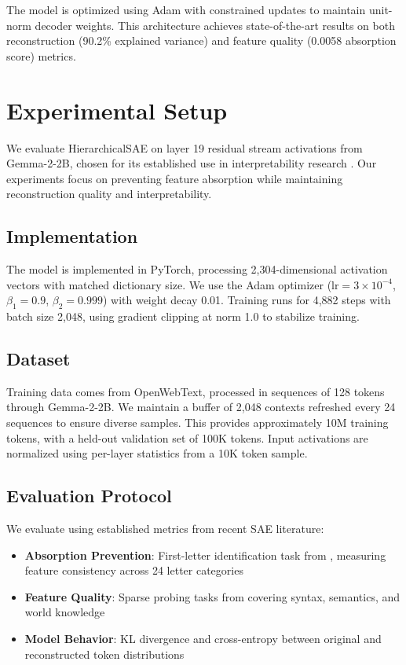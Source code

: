 \documentclass{article} %
\begin{document}
The model is optimized using Adam with constrained updates to maintain unit-norm decoder weights. This architecture achieves state-of-the-art results on both reconstruction (90.2\% explained variance) and feature quality (0.0058 absorption score) metrics.

\section{Experimental Setup}
\label{sec:experimental}

We evaluate HierarchicalSAE on layer 19 residual stream activations from Gemma-2-2B, chosen for its established use in interpretability research \cite{gaoScalingEvaluatingSparse}. Our experiments focus on preventing feature absorption while maintaining reconstruction quality and interpretability.

\subsection{Implementation}
The model is implemented in PyTorch, processing 2,304-dimensional activation vectors with matched dictionary size. We use the Adam optimizer ($\text{lr}=3\times10^{-4}$, $\beta_1=0.9$, $\beta_2=0.999$) with weight decay 0.01. Training runs for 4,882 steps with batch size 2,048, using gradient clipping at norm 1.0 to stabilize training.

\subsection{Dataset}
Training data comes from OpenWebText, processed in sequences of 128 tokens through Gemma-2-2B. We maintain a buffer of 2,048 contexts refreshed every 24 sequences to ensure diverse samples. This provides approximately 10M training tokens, with a held-out validation set of 100K tokens. Input activations are normalized using per-layer statistics from a 10K token sample.

\subsection{Evaluation Protocol}
We evaluate using established metrics from recent SAE literature:

\begin{itemize}
    \item \textbf{Absorption Prevention}: First-letter identification task from \cite{chaninAbsorptionStudyingFeature2024}, measuring feature consistency across 24 letter categories
    \item \textbf{Feature Quality}: Sparse probing tasks from \cite{gurneeFindingNeuronsHaystack2023} covering syntax, semantics, and world knowledge
    \item \textbf{Model Behavior}: KL divergence and cross-entropy between original and reconstructed token distributions
\end{itemize}
\end{document}
